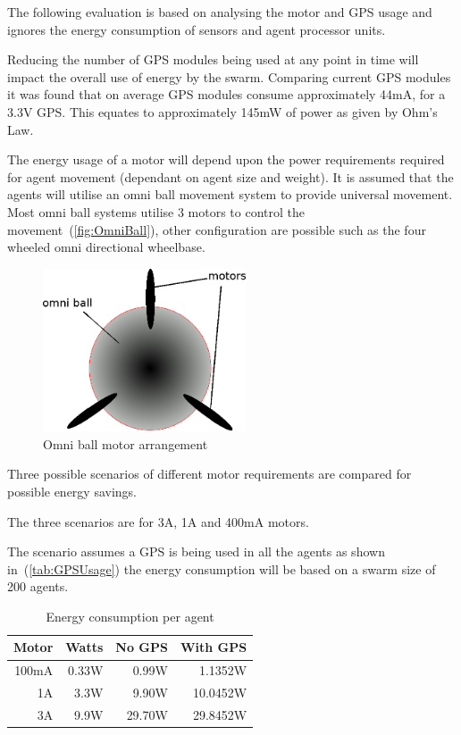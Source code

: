 The following evaluation is based on analysing the motor and GPS usage and ignores the energy consumption of sensors and agent processor units.

Reducing the number of GPS modules being used at any point in time will impact the overall use of energy by the swarm. Comparing current GPS modules it was found that on average GPS modules consume approximately 44mA, for a 3.3V GPS. This equates to approximately 145mW of power as given by Ohm's Law. 


The energy usage of a motor will depend upon the power requirements required for agent movement (dependant on agent size and weight). It is assumed that the agents will utilise an omni ball movement system to provide universal movement. Most omni ball systems utilise 3 motors to control the movement~(\autoref{fig:OmniBall}), other configuration are possible such as the four wheeled omni directional wheelbase\cite{PD:06}.

\begin{figure}[H]
\begin{center}
\includegraphics[width=6cm]{CHAPTER-6/figures/OmniBall}
\end{center}
\caption{Omni ball motor arrangement \label{fig:OmniBall}}
\end{figure}

Three possible scenarios of different motor requirements are compared for possible energy savings.

The three scenarios are for 3A, 1A and 400mA motors.

The scenario assumes a GPS is being used in all the agents as shown in~(\autoref{tab:GPSUsage}) the energy consumption will be based on a swarm size of 200 agents.

\begin{table}[H]
\begin{center}
\begin{tabular}{| r | r | r | r |}
\hline
Motor & Watts  & No GPS & With GPS \\ \hline
100mA &  0.33W &  0.99W & 1.1352W\\ \hline
1A    &  3.3W  &  9.90W & 10.0452W\\ \hline
3A    &  9.9W  & 29.70W & 29.8452W\\ \hline
\end{tabular}\caption{Energy consumption per agent} \label{tab:Energy1}
\end{center}
\end{table}

